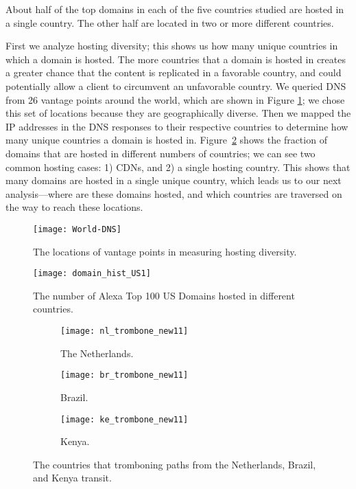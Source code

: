 \begin{finding}
About half of the top domains in each of the five countries studied are hosted in a single country.  The other half are located in two or more different countries.
\end{finding}
\noindent
First we analyze hosting diversity; this shows us how many unique countries in which a domain is hosted.  The more countries that a domain is hosted in creates a greater chance that the content is replicated in a favorable country, and could potentially allow a client to circumvent an unfavorable country.  We queried DNS from 26 vantage points around the world, which are shown in Figure \ref{fig:world}; we chose this set of locations because they are geographically diverse.  Then we mapped the IP addresses in the DNS responses to their respective countries to determine how many unique countries a domain is hosted in.  Figure~\ref{fig:host_diversity} shows the fraction of domains that are hosted in different numbers of countries; we can see two common hosting cases: 1) CDNs, and 2) a single hosting country.  This shows that many domains are hosted in a single unique country, which leads us to our next analysis---where are these domains hosted, and which countries are traversed on the way to reach these locations.

\begin{figure}[t]
\centering
\texttt{[image: World-DNS]}
\caption{The locations of vantage points in measuring hosting diversity.}
\label{fig:world}
\end{figure}

\begin{figure}[t]
\centering
\texttt{[image: domain\_hist\_US1]}
\caption{The number of Alexa Top 100 US Domains hosted in different countries.}
\label{fig:host_diversity}
\end{figure}


\begin{figure*}[t!]
\begin{minipage}{\linewidth}
\begin{subfigure}[b]{.32\linewidth}
\texttt{[image: nl\_trombone\_new11]}
\caption{The Netherlands.\label{fig:trombone_netherlands}}
\end{subfigure}
\begin{subfigure}[b]{.32\linewidth}
\texttt{[image: br\_trombone\_new11]}
\caption{Brazil.\label{fig:trombone_brazil}}
\end{subfigure}
\begin{subfigure}[b]{.32\linewidth}
\texttt{[image: ke\_trombone\_new11]}
\caption{Kenya.\label{fig:trombone_kenya}}
\end{subfigure}
\end{minipage}
\caption{The countries that tromboning paths from the Netherlands, Brazil, and Kenya transit.}
\label{fig:trombone}
\end{figure*}



